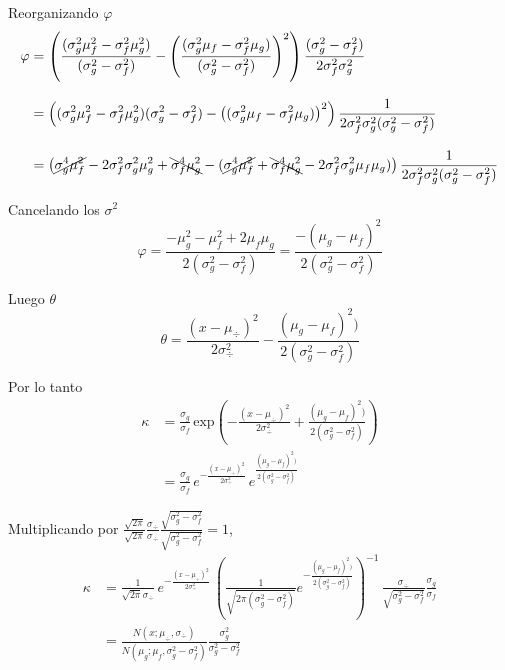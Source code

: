 \documentclass[article]{jss}
\begin{document}
\begin{appendix}
Reorganizando $\varphi$
\begin{equation}
\begin{split}
 \varphi & = \left( \frac{(\sigma_g^2\mu_f^2 - \sigma_f^2\mu_g^2)}{(\sigma_g^2 - \sigma_f^2)} - \left(\frac{(\sigma_g^2\mu_f - \sigma_f^2\mu_g)}{(\sigma_g^2 - \sigma_f^2)} \right)^2 \right) \frac{(\sigma_g^2 - \sigma_f^2)}{2\sigma_f^2\sigma_g^2} \\[0.3cm]
 & = \left((\sigma_g^2\mu_f^2 - \sigma_f^2\mu_g^2)(\sigma_g^2 - \sigma_f^2) - \left((\sigma_g^2\mu_f - \sigma_f^2\mu_g) \right)^2 \right) \frac{1}{2\sigma_f^2\sigma_g^2(\sigma_g^2 - \sigma_f^2)} \\[0.3cm]
 & =  \left( \cancel{\sigma_g^4\mu_f^2} - 2\sigma_f^2\sigma_g^2\mu_g^2 + \bcancel{\sigma_f^4\mu_g^2} - (\cancel{\sigma_g^4\mu_f^2} + \bcancel{\sigma_f^4\mu_g^2 } - 2\sigma_f^2\sigma_g^2\mu_f\mu_g)\right) \frac{1}{2\sigma_f^2\sigma_g^2(\sigma_g^2 - \sigma_f^2)}
 \end{split}
\end{equation}

Cancelando los $\sigma^2$
\begin{equation}
 \varphi = \frac{- \mu_g^2 - \mu_f^2 + 2\mu_f\mu_g}{2(\sigma_g^2 - \sigma_f^2)} = \frac{- (\mu_g - \mu_f)^2}{2(\sigma_g^2 - \sigma_f^2)}
\end{equation}

Luego $\theta$
\begin{equation}
 \theta = \frac{(x - \mu_{\div})^2}{2\sigma_{\div}^2} - \frac{(\mu_g - \mu_f)^2)}{2(\sigma_g^2 - \sigma_f^2)} 
\end{equation}

Por lo tanto
\begin{equation}
\begin{split}
 \kappa & = \frac{\sigma_g}{\sigma_f}  \, \text{exp}\left(- \frac{(x - \mu_{\div})^2}{2\sigma_{\div}^2} + \frac{(\mu_g - \mu_f)^2)}{2(\sigma_g^2 - \sigma_f^2)}  \right)\\[0.3cm]
 & = \frac{\sigma_g}{\sigma_f} \, e^{-\frac{(x - \mu_{\div})^2}{2\sigma_{\div}^2}} \, e^{\frac{(\mu_g - \mu_f)^2)}{2(\sigma_g^2 - \sigma_f^2)}}
\end{split}
\end{equation}

Multiplicando por $\frac{\sqrt{2\pi}}{\sqrt{2\pi}}\frac{\sigma_{\div}}{\sigma_{\div}}\frac{\sqrt{\sigma_g^2 - \sigma_f^2}}{\sqrt{\sigma_g^2 - \sigma_f^2}}=1$,
\begin{equation}
\begin{split}
 \kappa & =  \frac{1}{\sqrt{2\pi}\sigma_{\div}} \, e^{-\frac{(x - \mu_{\div})^2}{2\sigma_{\div}^2}} \, \left( \frac
 {1}{\sqrt{2\pi(\sigma_g^2 - \sigma_f^2)} } e^{-\frac{(\mu_g - \mu_f)^2)}{2(\sigma_g^2 - \sigma_f^2)}} \right)^{-1} \, \frac{\sigma_{\div}}{\sqrt{\sigma_g^2 - \sigma_f^2}}\frac{\sigma_g}{\sigma_f}\\[0.3cm]
 & = \frac{N\left(x; \mu_{\div},\sigma_{\div}\right)}{N\left(\mu_g;\mu_f,\sigma_g^2-\sigma_f^2\right)} \frac{\sigma_g^2}{\sigma_g^2 - \sigma_f^2}
\end{split}
\end{equation}




\end{appendix}
\end{document}
